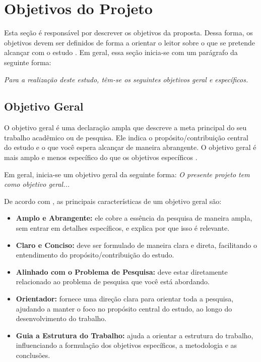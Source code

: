 \section{Objetivos do Projeto}\label{sec:obj_proj}

Esta seção é responsável por descrever os objetivos da proposta. Dessa forma, os objetivos devem ser definidos de forma a orientar o leitor sobre o que se pretende alcançar com o estudo \cite{Marconi2021}. Em geral, essa seção inicia-se com um parágrafo da seguinte forma:

\textit{Para a realização deste estudo, têm-se os seguintes objetivos geral e específicos.}

\subsection{Objetivo Geral}

O objetivo geral é uma declaração ampla que descreve a meta principal do seu trabalho acadêmico ou de pesquisa. Ele indica o propósito/contribuição central do estudo e o que você espera alcançar de maneira abrangente. O objetivo geral é mais amplo e menos específico do que os objetivos específicos \cite{Marconi2021,Wazlawick2021}.

Em geral, inicia-se um objetivo geral da seguinte forma: \textit{O presente projeto tem como objetivo geral...}

De acordo com , as principais características de um objetivo geral são:
\begin{itemize}[nosep, leftmargin=2.5cm]
    \item \textbf{Amplo e Abrangente:} ele cobre a essência da pesquisa de maneira ampla, sem entrar em detalhes específicos, e explica por que isso é relevante.
    \item \textbf{Claro e Conciso:} deve ser formulado de maneira clara e direta, facilitando o entendimento do propósito/contribuição do estudo.
    \item \textbf{Alinhado com o Problema de Pesquisa:} deve estar diretamente relacionado ao problema de pesquisa que você está abordando.
    \item \textbf{Orientador:} fornece uma direção clara para orientar toda a pesquisa, ajudando a manter o foco no propósito central do estudo, ao longo do desenvolvimento do trabalho.
    \item \textbf{Guia a Estrutura do Trabalho:} ajuda a orientar a estrutura do trabalho, influenciando a formulação dos objetivos específicos, a metodologia e as conclusões.
\end{itemize}

